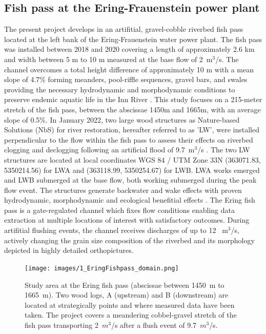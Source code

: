 \documentclass[draft,linenumbers,onecolumn]{agujournal2019} %
\begin{document}
\subsection{Fish pass at the Ering-Frauenstein power plant}
\label{sec:Sec2.1}
The present project develops in an artifitial, gravel-cobble riverbed fish pass located at the left bank of the Ering-Frauenstein water power plant. The fish pass was installed between 2018 and 2020 covering a length of approximately 2.6 km  and width between 5 m to 10 m measured at the base flow of  2~m$^3$/s. The channel overcomes a total height difference of approximately 10 m with a mean slope of 4.7\% forming meanders, pool-riffle sequences, gravel bars, and swales providing the necessary hydrodynamic and morphodynamic conditions to preserve endemic aquatic life in the Inn River \cite{schwindt2023fuzzylogic,zauner2020wie}. This study focuses on a 215-meter stretch of the fish pass, between the abscissae 1450m and 1665m, with an average slope of 0.5\%. In January 2022, two large wood structures as Nature-based Solutions (NbS) for river restoration, hereafter referred to as 'LW', were installed perpendicular to the flow within the fish pass to assess their effects on riverbed clogging and declogging following an artificial flood of 9.7~m$^3$/s  \cite{schwindt2023fuzzylogic}. The two LW structures are located at local coordinates WGS 84 / UTM Zone 33N (363071.83, 5350214.56) for LWA and (363118.99, 5350254.67) for LWB. LWA works emerged and LWB submerged at the base flow, both working submerged during the peak flow event. The structures generate backwater and wake effects with proven hydrodynamic, morphodynamic and ecological benefitial effects \cite{schalko2021flow,schwindt2023fuzzylogic}.    
The Ering fish pass is a gate-regulated channel which fixes flow conditions enabling data extraction at multiple locations of interest with satisfactory outcomes. During artifitial flushing events, the channel receives discharges of up to 12 ~m$^3$/s, actively changing the grain size composition of the riverbed and its morphology depicted in highly detailed orthopictures.


\begin{figure}[htbp]
	\centering
	\texttt{[image: images/1\_EringFishpass\_domain.png]}
	\caption{Study area  at the Ering fish pass (abscissae between 1450~m to 1665~m). Two wood logs, A (upstream) and B (downstream) are located at strategically points and where measured data have been taken. The project covers a meandering cobbel-gravel stretch of the fish pass transporting 2~$m^3$/s after a flush event of 9.7~$m^3$/s.   
	}
	\label{fig:StudyArea}
\end{figure}
\end{document}
